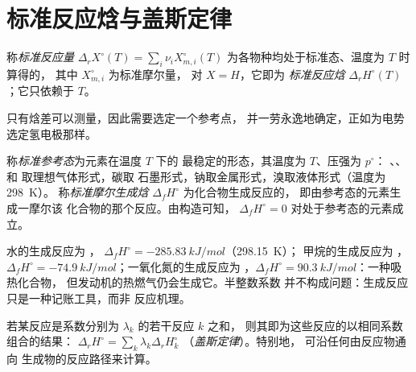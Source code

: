 \section{标准反应焓与盖斯定律}

\begin{definition}[标准反应量]\label{def:b2:reaction-enthalpy:standard-reaction-enthalpy}
称\emph{标准反应量}
$\Delta_r X^\circ(T) = \sum_i\nu_iX_{m,i}^\circ(T)$ 为各物种均处于标准态、温度为 $T$ 时算得的，
其中 $X_{m,i}^\circ$ 为标准摩尔量，
对 $X = H$，它即为
\emph{标准反应焓}
$\Delta_r H^\circ(T)$；它只依赖于 $T$。
\end{definition}

只有焓差可以测量，因此需要选定一个参考点，
并一劳永逸地确定，正如为电势选定氢电极那样。

\begin{definition}\label{def:b2:reaction-enthalpy:formation}
称\emph{标准参考态}为元素在温度 $T$ 下的
最稳定的形态，其温度为 $T$、压强为 $p^\circ$：
、、 和  取理想气体形式，碳取
石墨形式，钠取金属形式，溴取液体形式（温度为 \qty{298}{K}）。
称\emph{标准摩尔生成焓}
$\Delta_f H^\circ$ 为化合物生成反应的，
即由参考态的元素生成一摩尔该
化合物的那个反应。由构造可知，
$\Delta_f H^\circ = 0$ 对处于参考态的元素成立。
\end{definition}

\begin{example}[生成反应]\label{ex:b2:reaction-enthalpy:formation}
水的生成反应为 ，
$\Delta_f H^\circ = \qty{-285.83}{kJ/mol}$（\qty{298.15}{K}）；
甲烷的生成反应为 ，$\Delta_f H^\circ =
\qty{-74.9}{kJ/mol}$；一氧化氮的生成反应为 ，$\Delta_f H^\circ = \qty{+90.3}{kJ/mol}$：一种吸热化合物，
但发动机的热燃气仍会生成它。半整数系数
并不构成问题：生成反应只是一种记账工具，而非
反应机理。
\end{example}

\begin{theorem}[盖斯定律]\label{thm:b2:reaction-enthalpy:hess}
若某反应是系数分别为 $\lambda_k$ 的若干反应 $k$ 之和，
则其即为这些反应的以相同系数组合的结果：
$\Delta_r H^\circ = \sum_k\lambda_k\Delta_r H_k^\circ$
（\emph{盖斯定律}）。特别地，
可沿任何由反应物通向
生成物的反应路径来计算。
\end{theorem}

